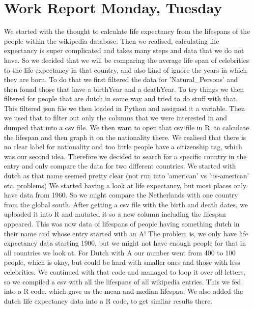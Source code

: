 \documentclass{article}
\begin{document}
 \section{Work Report Monday, Tuesday}
We started with the thought to calculate life expectancy from the lifespans of the people within the wikipedia database. Then we realised, calculating life expectancy is super complicated and takes many steps and data that we do not have. 
So we decided that we will be comparing the average life span of celebrities to the life expectancy in that country, and also kind of ignore the years in which they are born. 
To do that we first filtered the data for 'Natural\_Persons' and then found those that have a birthYear and a deathYear. To try things we then filtered for people that are dutch in some way and tried to do stuff with that.
This filtered json file we then loaded in Python and assigned it a variable. Then we used that to filter out only the columns that we were interested in and dumped that into a csv file.
We then want to open that csv file in R, to calculate the lifespan and then graph it on the nationality there. 
We realised that there is no clear label for nationality and too little people have a citizenship tag, which was our second idea. Therefore we decided to search for a specific country in the entry and only compare the data for two different countries. We started with dutch as that name seemed pretty clear (not run into 'american' vs 'us-american' etc. problems)
We started having a look at life expectancy, but most places only have data from 1960. So we might compare the Netherlands with one country from the global south. 
After getting a csv file with the birth and death dates, we uploaded it into R and mutated it so a new column including the lifespan appeared. This was now data of lifespans of people having something dutch in their name and whose entry started with an A!
The problem is, we only have life expectancy data starting 1900, but we might not have enough people for that in all countries we look at. For Dutch with A our number went from 400 to 100 people, which is okay, but could be hard with smaller ones and those with less celebrities.
We continued with that code and managed to loop it over all letters, so we compiled a csv with all the lifespans of all wikipedia entries. This we fed into a R code, which gave us the mean and median lifespan. 
We also added the dutch life expectancy data into a R code, to get similar results there.
\end{document}
